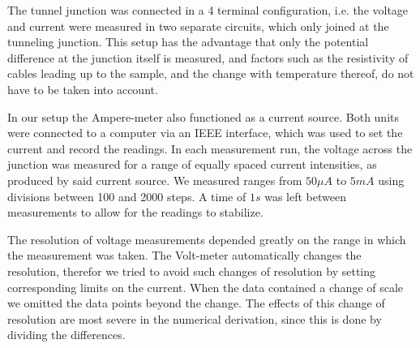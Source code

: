 
The tunnel junction was connected in a 4 terminal configuration, i.e. the voltage and current were measured in two separate circuits, which only joined at the tunneling junction. This setup has the advantage that only the potential difference at the junction itself is measured, and factors such as the resistivity of cables leading up to the sample, and the change with temperature thereof, do not have to be taken into account. 

In our setup the Ampere-meter also functioned as a current source. Both units were connected to a computer via an IEEE interface, which was used to set the current and record the readings. In each measurement run, the voltage across the junction was measured for a range of equally spaced current intensities, as produced by said current source.  We measured ranges from $50 \mu A$ to $5 mA$ using divisions between 100 and 2000 steps. A time of $1s$ was left between measurements to allow for the readings to stabilize.

The resolution of voltage measurements depended greatly on the range in which the measurement was taken. The Volt-meter automatically changes the resolution, therefor we tried to avoid such changes of resolution by setting corresponding limits on the current. When the data contained a change of scale we omitted the data points beyond the change. The effects of this change of resolution are most severe in the numerical derivation, since this is done by dividing the differences.



